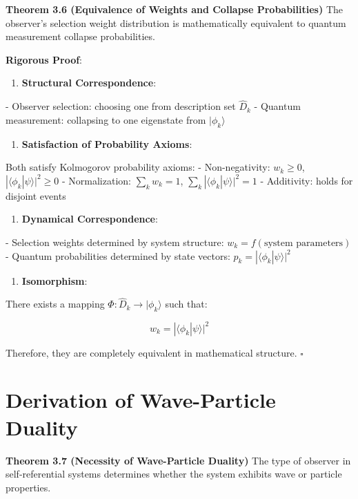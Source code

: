 \textbf{Theorem 3.6 (Equivalence of Weights and Collapse Probabilities)}
\label{thm:3.6}
The observer's selection weight distribution is mathematically equivalent to quantum measurement collapse probabilities.

\textbf{Rigorous Proof}:

\begin{enumerate}
\item \textbf{Structural Correspondence}:
\end{enumerate}
   - Observer selection: choosing one from description set ${\hat{D}_k}$
   - Quantum measurement: collapsing to one eigenstate from ${|\phi_k\rangle}$
   
\begin{enumerate}
\item \textbf{Satisfaction of Probability Axioms}:
\end{enumerate}
   Both satisfy Kolmogorov probability axioms:
   - Non-negativity: $w_k \geq 0$, $|\langle\phi_k|\psi\rangle|^2 \geq 0$
   - Normalization: $\sum_k w_k = 1$, $\sum_k |\langle\phi_k|\psi\rangle|^2 = 1$
   - Additivity: holds for disjoint events
   
\begin{enumerate}
\item \textbf{Dynamical Correspondence}:
\end{enumerate}
   - Selection weights determined by system structure: $w_k = f(\text{system parameters})$
   - Quantum probabilities determined by state vectors: $p_k = |\langle\phi_k|\psi\rangle|^2$
   
\begin{enumerate}
\item \textbf{Isomorphism}:
\end{enumerate}
   There exists a mapping $\Phi: {\hat{D}_k} \to {|\phi_k\rangle}$ such that:
   
\begin{equation}
w_k = |\langle\phi_k|\psi\rangle|^2
\end{equation}

Therefore, they are completely equivalent in mathematical structure. $\square$

\section{Derivation of Wave-Particle Duality}
\label{sec:ch03_quantum:derivation-of-wave-particle-duality}

\textbf{Theorem 3.7 (Necessity of Wave-Particle Duality)}
\label{thm:3.7}
The type of observer in self-referential systems determines whether the system exhibits wave or particle properties.

